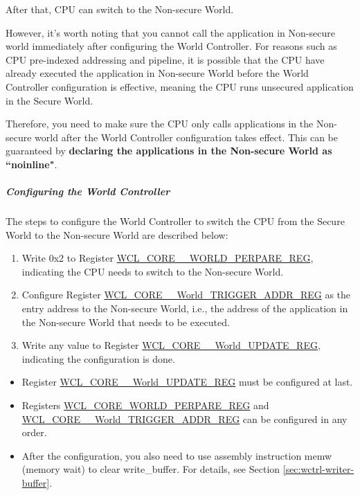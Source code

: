 \documentclass[main\_\_EN.tex]{subfiles}
\begin{document}
After that, CPU can switch to the Non-secure World.

However, it's worth noting that you cannot call the application in Non-secure world immediately after configuring the World Controller. For reasons such as CPU pre-indexed addressing and pipeline, it is possible that the CPU have already executed the application in Non-secure World before the World Controller configuration is effective, meaning the CPU runs unsecured application in the Secure World.

Therefore, you need to make sure the CPU only calls applications in the Non-secure world after the World Controller configuration takes effect. This can be guaranteed by \textbf{declaring the applications in the Non-secure World as ``noinline"}.


\subparagraph{Configuring the World Controller}

The steps to configure the World Controller to switch the CPU from the Secure World to the Non-secure World are described below:
\begin{enumerate}
    \item Write 0x{}2 to Register \hyperref[regdesc:WCLCORE0WORLDPREPAREREG]{WCL\_CORE\_\_WORLD\_PERPARE\_REG}, indicating the CPU needs to switch to the Non-secure World.
    \item Configure Register \hyperref[regdesc:WCLCORE0WORLDTRIGGERADDRREG]{WCL\_CORE\_\_World\_TRIGGER\_ADDR\_REG} as the entry address to the Non-secure World, i.e., the address of the application in the Non-secure World that needs to be executed.
    \item Write any value to Register \hyperref[regdesc:WCLCORE0WORLDUPDATEREG]{WCL\_CORE\_\_World\_UPDATE\_REG}, indicating the configuration is done.
\end{enumerate}

\begin{tiplisting}\label{note:38-WCTRL-safe2unsafe}
\vspace{-2em}
\begin{itemize}
    \item Register \hyperref[regdesc:WCLCORE0WORLDUPDATEREG]{WCL\_CORE\_\_World\_UPDATE\_REG}  must be configured at last.
    \item Registers \hyperref[regdesc:WCLCORE0WORLDPREPAREREG]{WCL\_CORE\_WORLD\_PERPARE\_REG} and \hyperref[regdesc:WCLCORE0WORLDTRIGGERADDRREG]{WCL\_CORE\_\_World\_TRIGGER\_ADDR\_REG} can be configured in any order.
    \item After the configuration, you also need to use assembly instruction memw (memory wait) to clear write\_buffer. For details, see Section \ref{sec:wctrl-writer-buffer}.
\end{itemize}
\end{tiplisting}
\end{document}
